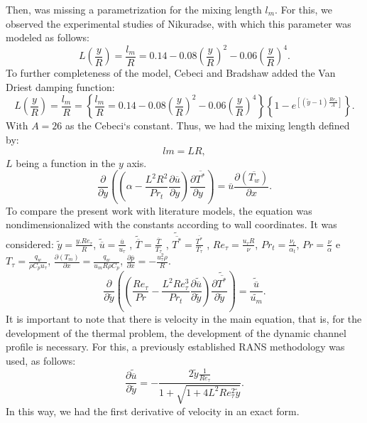 \documentclass[10pt]{article} %
\begin{document}
Then, was missing a parametrization for the mixing length $ l_m $. For this, we observed the experimental studies of Nikuradse, with which this parameter was modeled as follows:
\begin{equation}
L\left(\frac{y}{R}\right) = \frac{l_m}{R} = 0.14 - 0.08 \left(\frac{y}{R}\right)^2 - 0.06\left(\frac{y}{R}\right)^4.
\end{equation}
To further completeness of the model, Cebeci and Bradshaw added the Van Driest damping function:
\begin{equation}
L\left(\frac{y}{R}\right)  = \frac{l_m}{R} = \left\{\frac{l_m}{R} = 0.14 - 0.08 \left(\frac{y}{R}\right)^2 - 0.06\left(\frac{y}{R}\right)^4\right\}\left\{  1 - e^{[(\tilde{y} - 1) \frac{Re_\tau}{A}]}\right\}.
\end{equation}
With $A = 26$ as the Cebeci`s constant. Thus, we had the mixing length defined by:
\begin{equation}
lm = L R,
\end{equation}
$ L $ being a function in the $ y $ axis.
\begin{equation}
{\frac{\partial{}}{\partial{y}}} \left( \left( \alpha   
- \frac{{L}^2 R ^2}{Pr_t}\frac{\partial \overline{u}}{\partial y} \right) \frac{\partial \overline{T^\ast}}{\partial y} \right)
= 
\overline{u}\frac{\partial{}\left(\overline{T_w}\right)  }{\partial{x}}.
\end{equation}
 To compare the present work with literature models, the equation was nondimensionalized with the constants according to wall coordinates. It was considered: $ \tilde{y} = \frac{y . Re_\tau}{R} $, $ \tilde{\overline{u}} = \frac{\overline{u}}{u_\tau} $ , $ \tilde{\overline{T}} = \frac{\overline{T}}{T_\tau} $ , $ \tilde{\overline{T^\ast}} = \frac{\overline{T^\ast}}{T_\tau} $ , $Re_\tau = \frac{u_\tau R}{\nu}$, $Pr_t = \frac{\nu_t}{\alpha_t}$, $Pr = \frac{\nu}{\alpha}$ e $T_\tau = \frac{q_w}{\rho C_p u_\tau}$, $\frac{\partial{\left(T_m\right)}}{\partial{x}} = \frac{q_w}{u_m  R \rho  C_p } $, $\frac{\partial \overline{p}}{\partial x} = - \frac{u_\tau^2 \rho}{R} $.
\\
\begin{equation}
{\frac{\partial{}}{\partial{\tilde{y}}}} \left( \left( \frac{Re_\tau}{Pr}   
- \frac{{L}^2 Re_\tau ^3}{Pr_t}\frac{\partial \tilde{\overline{u}}}{\partial \tilde{y}} \right) \frac{\partial \tilde{\overline{T^\ast}}}{\partial \tilde{y}} \right)
= 
\frac{\tilde{\overline{u}}}{\tilde{u_m}}.
\end{equation}
It is important to note that there is velocity in the main equation, that is, for the development of the thermal problem, the development of the dynamic channel profile is necessary. For this, a previously established RANS methodology \cite{Luigi} was used, as follows:
\begin{equation}
\frac{\partial \tilde{\overline{u}}}{\partial \tilde{y}} = - \frac{2 \tilde{y} \frac{1}{Re_\tau} }{ 1 + \sqrt{ 1 + 4 L ^2 Re_\tau ^2 \tilde{y}}}.
\end{equation}		
In this way, we had the first derivative of velocity in an exact form.
\end{document}

